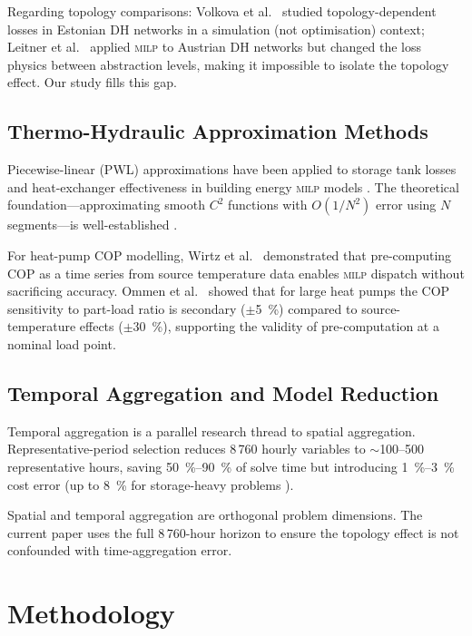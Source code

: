 \documentclass[a4paper,fleqn]{cas-sc}
\newcommand{\milp}{\textsc{milp}}
\begin{document}
Regarding topology comparisons: Volkova et al.\ \cite{Volkova2019} studied
topology-dependent losses in Estonian DH networks in a simulation (not
optimisation) context; Leitner et al.\ \cite{Leitner2019} applied \milp{} to
Austrian DH networks but changed the loss physics between abstraction levels,
making it impossible to isolate the topology effect.  Our study fills this gap.

\subsection{Thermo-Hydraulic Approximation Methods}

Piecewise-linear (PWL) approximations have been applied to storage tank losses
and heat-exchanger effectiveness in building energy \milp{} models
\cite{Papadopoulos2018,Boydens2016}.  The theoretical foundation---approximating
smooth $C^2$ functions with $O(1/N^2)$ error using $N$ segments---is
well-established \cite{Rebennack2020}.

For heat-pump COP modelling, Wirtz et al.\ \cite{Wirtz2018} demonstrated that
pre-computing COP as a time series from source temperature data enables \milp{}
dispatch without sacrificing accuracy.  Ommen et al.\ \cite{Ommen2016} showed
that for large heat pumps the COP sensitivity to part-load ratio is secondary
($\pm$\SI{5}{\percent}) compared to source-temperature effects ($\pm$\SI{30}{\percent}),
supporting the validity of pre-computation at a nominal load point.

\subsection{Temporal Aggregation and Model Reduction}

Temporal aggregation is a parallel research thread to spatial aggregation.
Representative-period selection \cite{Kotzur2018} reduces 8\,760 hourly
variables to $\sim$100--500 representative hours, saving \SIrange{50}{90}{\percent}
of solve time but introducing \SIrange{1}{3}{\percent} cost error (up to
\SI{8}{\percent} for storage-heavy problems \cite{Baumgaertner2019}).

Spatial and temporal aggregation are orthogonal problem dimensions.  The
current paper uses the full 8\,760-hour horizon to ensure the topology effect
is not confounded with time-aggregation error.

\section{Methodology}
\label{sec:method}
\end{document}
